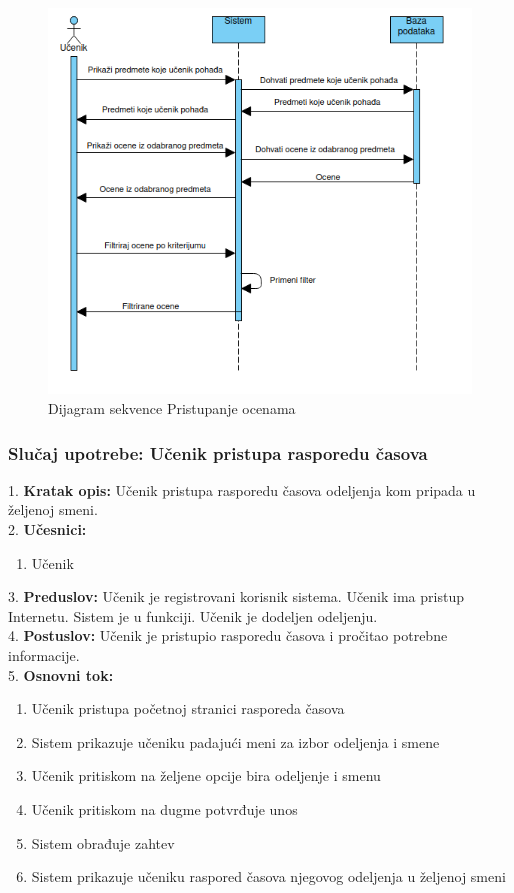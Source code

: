 \documentclass{article}
\begin{document}
\begin{figure} [!ht]
    \begin{center}
        \includegraphics[scale=0.5]{imgs/Dijagram_sekvence_ucenik_pristupa_ocenama.png}
    \end{center}
\caption{Dijagram sekvence Pristupanje ocenama}
\end{figure}


\newpage
\subsubsection{Slučaj upotrebe: Učenik pristupa rasporedu časova} 
1. \textbf{Kratak opis:} Učenik pristupa rasporedu časova odeljenja kom pripada u željenoj smeni. \\

2. \textbf{Učesnici:}
\begin{enumerate} [label=(\alph*)]
\item Učenik
\end{enumerate} 

3. \textbf{Preduslov:} Učenik je registrovani korisnik sistema. Učenik ima pristup Internetu. Sistem je u funkciji. Učenik je dodeljen odeljenju. \\

4. \textbf{Postuslov:} Učenik je pristupio rasporedu časova i pročitao potrebne informacije. \\

5. \textbf{Osnovni tok:} 
\begin{enumerate} [label=(\alph*)]
\item Učenik pristupa početnoj stranici rasporeda časova
\item Sistem prikazuje učeniku padajući meni za izbor odeljenja i smene
\item Učenik pritiskom na željene opcije bira odeljenje i smenu
\item Učenik pritiskom na dugme potvrđuje unos 
\item Sistem obrađuje zahtev
\item Sistem prikazuje učeniku raspored časova njegovog odeljenja u željenoj smeni 
\end{enumerate}
\end{document}
